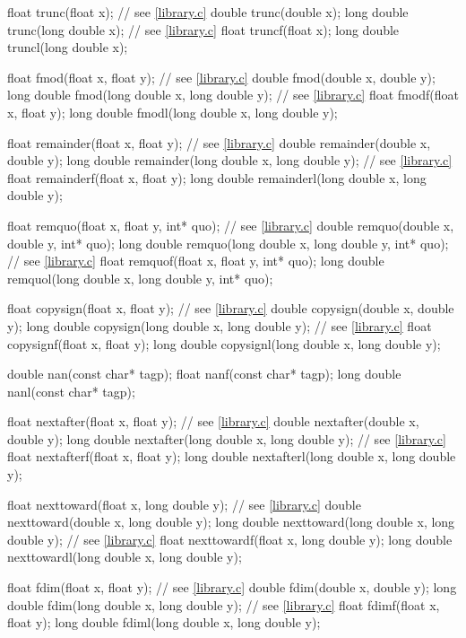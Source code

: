\begin{codeblock}
{  float trunc(float x);                 // see \ref{library.c}
  double trunc(double x);
  long double trunc(long double x);     // see \ref{library.c}
  float truncf(float x);
  long double truncl(long double x);

  float fmod(float x, float y);         // see \ref{library.c}
  double fmod(double x, double y);
  long double fmod(long double x, long double y);   // see \ref{library.c}
  float fmodf(float x, float y);
  long double fmodl(long double x, long double y);

  float remainder(float x, float y);    // see \ref{library.c}
  double remainder(double x, double y);
  long double remainder(long double x, long double y);  // see \ref{library.c}
  float remainderf(float x, float y);
  long double remainderl(long double x, long double y);

  float remquo(float x, float y, int* quo);     // see \ref{library.c}
  double remquo(double x, double y, int* quo);
  long double remquo(long double x, long double y, int* quo);   // see \ref{library.c}
  float remquof(float x, float y, int* quo);
  long double remquol(long double x, long double y, int* quo);

  float copysign(float x, float y);     // see \ref{library.c}
  double copysign(double x, double y);
  long double copysign(long double x, long double y);   // see \ref{library.c}
  float copysignf(float x, float y);
  long double copysignl(long double x, long double y);

  double nan(const char* tagp);
  float nanf(const char* tagp);
  long double nanl(const char* tagp);

  float nextafter(float x, float y);    // see \ref{library.c}
  double nextafter(double x, double y);
  long double nextafter(long double x, long double y);  // see \ref{library.c}
  float nextafterf(float x, float y);
  long double nextafterl(long double x, long double y);

  float nexttoward(float x, long double y);     // see \ref{library.c}
  double nexttoward(double x, long double y);
  long double nexttoward(long double x, long double y);     // see \ref{library.c}
  float nexttowardf(float x, long double y);
  long double nexttowardl(long double x, long double y);

  float fdim(float x, float y);         // see \ref{library.c}
  double fdim(double x, double y);
  long double fdim(long double x, long double y);   // see \ref{library.c}
  float fdimf(float x, float y);
  long double fdiml(long double x, long double y);

}
\end{codeblock}
